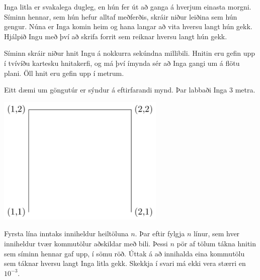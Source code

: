 

Inga litla er svakalega dugleg, en hún fer út að ganga á hverjum einasta
morgni. Síminn hennar, sem hún hefur alltaf meðferðis, skráir niður leiðina sem
hún gengur. Núna er Inga komin heim og hana langar að vita hversu langt hún
gekk. Hjálpið Ingu með því að skrifa forrit sem reiknar hversu langt hún gekk.

Síminn skráir niður hnit Ingu á nokkurra sekúndna millibili. Hnitin eru gefin
upp í tvívíðu kartesku hnitakerfi, og má því ímynda sér að Inga gangi um
á flötu plani. Öll hnit eru gefin upp í metrum.

Eitt dæmi um göngutúr er sýndur á eftirfarandi mynd. Þar labbaði Inga $3$
metra.

\includegraphics[width=0.6\textwidth]{path.png}

Fyrsta lína inntaks inniheldur heiltöluna $n$. Þar eftir fylgja $n$ línur, sem
hver inniheldur tvær kommutölur aðskildar með bili. Þessi $n$ pör af tölum
tákna hnitin sem síminn hennar gaf upp, í sömu röð. Úttak á að innihalda eina
kommutölu sem táknar hversu langt Inga litla gekk. Skekkja í svari má ekki vera
stærri en $10^{-3}$.

